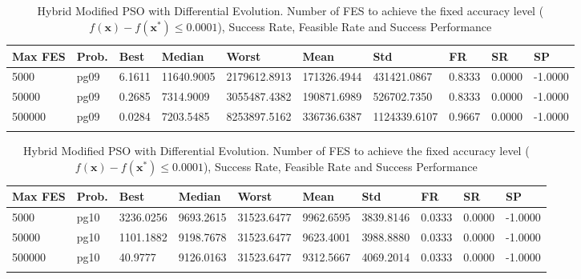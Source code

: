 \documentclass[10pt, a4paper]{book}
\begin{document}
\begin{center}
\begin{longtable}{l l l l l l l l l l}
\textbf{Max FES} & \textbf{Prob.} & \textbf{Best} & \textbf{Median} & \textbf{Worst} & \textbf{Mean} & \textbf{Std} & \textbf{FR} & \textbf{SR} & \textbf{SP} \\
\hline
5000 & pg09 & 6.1611 & 11640.9005 & 2179612.8913 & 171326.4944 & 431421.0867 & 0.8333 & 0.0000 & -1.0000 \\
50000 & pg09 & 0.2685 & 7314.9009 & 3055487.4382 & 190871.6989 & 526702.7350 & 0.8333 & 0.0000 & -1.0000 \\
500000 & pg09 & 0.0284 & 7203.5485 & 8253897.5162 & 336736.6387 & 1124339.6107 & 0.9667 & 0.0000 & -1.0000 \\

\caption{ Hybrid Modified PSO with Differential Evolution. Number of FES to achieve the fixed accuracy level ($f(\mathbf{x}) - f(\mathbf{x}^{*}) \leq 0.0001$), Success Rate, Feasible Rate and Success Performance }
\end{longtable}
\end{center}

\begin{center}
\begin{longtable}{l l l l l l l l l l}
\textbf{Max FES} & \textbf{Prob.} & \textbf{Best} & \textbf{Median} & \textbf{Worst} & \textbf{Mean} & \textbf{Std} & \textbf{FR} & \textbf{SR} & \textbf{SP} \\
\hline
5000 & pg10 & 3236.0256 & 9693.2615 & 31523.6477 & 9962.6595 & 3839.8146 & 0.0333 & 0.0000 & -1.0000 \\
50000 & pg10 & 1101.1882 & 9198.7678 & 31523.6477 & 9623.4001 & 3988.8880 & 0.0333 & 0.0000 & -1.0000 \\
500000 & pg10 & 40.9777 & 9126.0163 & 31523.6477 & 9312.5667 & 4069.2014 & 0.0333 & 0.0000 & -1.0000 \\

\caption{ Hybrid Modified PSO with Differential Evolution. Number of FES to achieve the fixed accuracy level ($f(\mathbf{x}) - f(\mathbf{x}^{*}) \leq 0.0001$), Success Rate, Feasible Rate and Success Performance }
\end{longtable}
\end{center}
\end{document}
